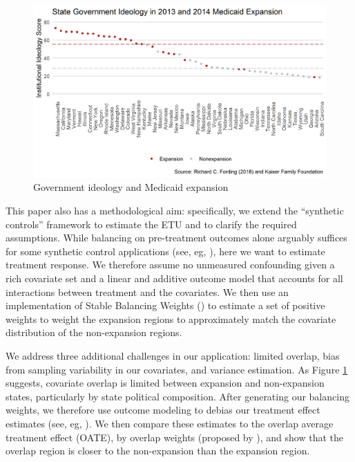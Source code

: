\documentclass[12pt]{article}
\begin{document}
\begin{figure}
    \begin{center}
    \includegraphics[scale=0.7]{images/political-expansion-plot.png}
    \caption{Government ideology and Medicaid expansion}
    \label{fig1}
    \end{center}
\end{figure}

This paper also has a methodological aim: specifically, we extend the ``synthetic controls'' framework to estimate the ETU and to clarify the required assumptions. While balancing on pre-treatment outcomes alone arguably suffices for some synthetic control applications (see, eg, \cite{botosaru2017role}), here we want to estimate treatment response. We therefore assume no unmeasured confounding given a rich covariate set and a linear and additive outcome model that accounts for all interactions between treatment and the covariates. We then use an implementation of Stable Balancing Weights (\cite{zubizarreta2015stable}) to estimate a set of positive weights to weight the expansion regions to approximately match the covariate distribution of the non-expansion regions. 

We address three additional challenges in our application: limited overlap, bias from sampling variability in our covariates, and variance estimation. As Figure \ref{fig1} suggests, covariate overlap is limited between expansion and non-expansion states, particularly by state political composition. After generating our balancing weights, we therefore use outcome modeling to debias our treatment effect estimates (see, eg, \cite{ben2018augmented}). We then compare these estimates to the overlap average treatment effect (OATE), by overlap weights (proposed by \cite{li2018balancing}), and show that the overlap region is closer to the non-expansion than the expansion region. 
\end{document}
